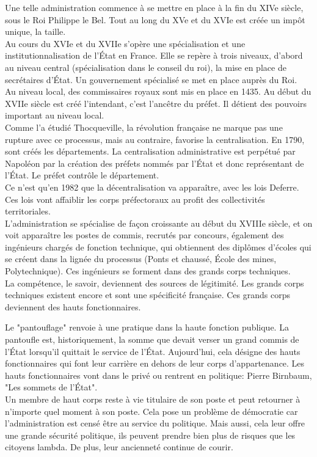 \documentclass[10pt, a4paper, openany]{book}
\begin{document}
Une telle administration commence à se mettre en place à la fin du XIVe siècle, sous le Roi Philippe le Bel. Tout au long du XVe et du XVIe est créée un impôt unique, la taille. \\
Au cours du XVIe et du XVIIe s'opère une spécialisation et une institutionnalisation de l'État en France. Elle se repère à trois niveaux, d'abord au niveau central (spécialisation dans le conseil du roi), la mise en place de secrétaires d'État. Un gouvernement spécialisé se met en place auprès du Roi. \\
Au niveau local, des commissaires royaux sont mis en place en 1435. Au début du XVIIe siècle est créé l'intendant, c'est l'ancêtre du préfet. Il détient des pouvoirs important au niveau local. \\
Comme l'a étudié Thocqueville, la révolution française ne marque pas une rupture avec ce processus, mais au contraire, favorise la centralisation. En 1790, sont créés les départements. La centralisation administrative est perpétué par Napoléon par la création des préfets nommés par l'État et donc représentant de l'État. Le préfet contrôle le département. \\
Ce n'est qu'en 1982 que la décentralisation va apparaître, avec les lois Deferre. Ces lois vont affaiblir les corps préfectoraux au profit des collectivités territoriales. \\
L'administration se spécialise de façon croissante au début du XVIIIe siècle, et on voit apparaître les postes de commis, recrutés par concours, également des ingénieurs chargés de fonction technique, qui obtiennent des diplômes d'écoles qui se créent dans la lignée du processus (Ponts et chaussé, École des mines, Polytechnique). Ces ingénieurs se forment dans des grands corps techniques. \\
La compétence, le savoir, deviennent des sources de légitimité. Les grands corps techniques existent encore et sont une spécificité française. Ces grands corps deviennent des hauts fonctionnaires.


Le "pantouflage" renvoie à une pratique dans la haute fonction publique. La pantoufle est, historiquement, la somme que devait verser un grand commis de l'État lorsqu'il quittait le service de l'État. Aujourd'hui, cela désigne des hauts fonctionnaires qui font leur carrière en dehors de leur corps d'appartenance. Les hauts fonctionnaires vont dans le privé ou rentrent en politique: Pierre Birnbaum, "Les sommets de l'État". \\
Un membre de haut corps reste à vie titulaire de son poste et peut retourner à n'importe quel moment à son poste. Cela pose un problème de démocratie car l'administration est censé être au service du politique. Mais aussi, cela leur offre une grande sécurité politique, ils peuvent prendre bien plus de risques que les citoyens lambda. De plus, leur ancienneté continue de courir. 
\end{document}
